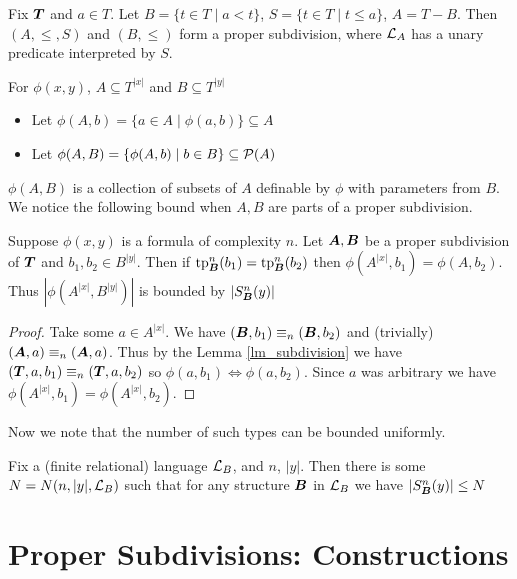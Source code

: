 \documentclass{amsart}
\DeclareMathOperator{\TT}{\boldface T}
\DeclareMathOperator{\A}{\boldface A}
\DeclareMathOperator{\B}{\boldface B}
\begin{document}
\begin{Example} \label{ex_cone}
	Fix $\TT$ and $a \in T$. Let $B = \{t \in T \mid a < t\}$, $S = \{t \in T \mid t \leq a\}$, $A = T - B$. Then $(A, \leq, S)$ and $(B, \leq)$ form a proper subdivision, where $\mathcal L_A$ has a unary predicate interpreted by $S$.
\end{Example}

\begin{Definition} For $\phi(x, y)$, $A \subseteq T^{|x|}$ and $B \subseteq T^{|y|}$
\begin{itemize}
	\item Let $\phi(A, b) = \{a \in A \mid \phi(a, b)\} \subseteq A$
	\item Let $\phi(A, B) = \{\phi(A, b) \mid b \in B\} \subseteq \mathcal P(A)$	
\end{itemize}
\end{Definition}
$\phi(A, B)$ is a collection of subsets of $A$ definable by $\phi$ with parameters from $B$. We notice the following bound when $A, B$ are parts of a proper subdivision.

\begin{Corollary} \label{cor_type_count}
	Suppose $\phi(x,y)$ is a formula of complexity $n$. Let $\A, \B$ be a proper subdivision of $\TT$ and $b_1, b_2 \in B^{|y|}$. Then if $\tp^n_{\B}(b_1) = \tp^n_{\B}(b_2)$ then $\phi(A^{|x|}, b_1) = \phi(A, b_2)$. Thus $|\phi(A^{|x|}, B^{|y|})|$ is bounded by $|S^n_{\B}(y)|$
\end{Corollary}

\begin{proof}
	Take some $a \in A^{|x|}$. We have $(\B, b_1) \equiv_n (\B, b_2)$ and (trivially) $(\A, a) \equiv_n (\A, a)$. Thus by the Lemma \ref{lm_subdivision} we have $(\TT, a, b_1) \equiv_n (\TT, a, b_2)$ so $\phi(a, b_1) \iff \phi(a, b_2)$. Since $a$ was arbitrary we have $\phi(A^{|x|}, b_1) = \phi(A^{|x|}, b_2)$.
\end{proof}

Now we note that the number of such types can be bounded uniformly.

\begin{Note} \label{nt_type_count}
	Fix a (finite relational) language $\mathcal L_B$, and $n$, $|y|$. Then there is some $N = N(n, |y|, \mathcal L_B)$ such that for any structure $\B$ in $\mathcal L_B$ we have $|S^n_{\B}(y)| \leq N$ 
\end{Note}


\section{Proper Subdivisions: Constructions}
\end{document}
